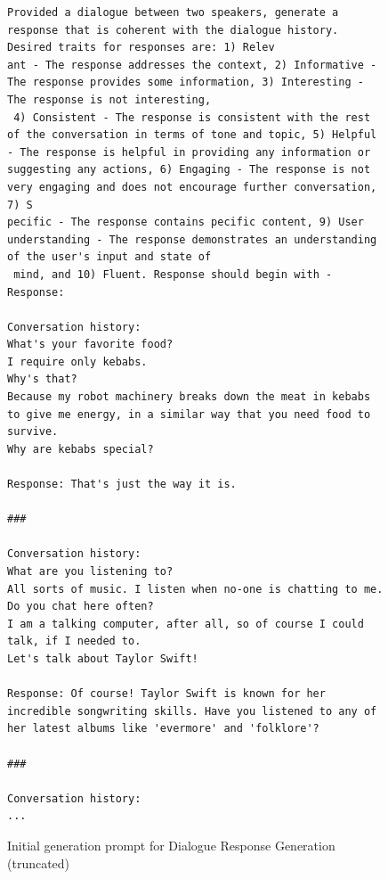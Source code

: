 \begin{figure}

\begin{small}
    \captionsetup{justification=centering, labelfont=bf, font=small}
    \begin{verbatim}
Provided a dialogue between two speakers, generate a response that is coherent with the dialogue history. Desired traits for responses are: 1) Relev
ant - The response addresses the context, 2) Informative - The response provides some information, 3) Interesting - The response is not interesting,
 4) Consistent - The response is consistent with the rest of the conversation in terms of tone and topic, 5) Helpful - The response is helpful in providing any information or suggesting any actions, 6) Engaging - The response is not very engaging and does not encourage further conversation, 7) S
pecific - The response contains pecific content, 9) User understanding - The response demonstrates an understanding of the user's input and state of
 mind, and 10) Fluent. Response should begin with - Response:

Conversation history:
What's your favorite food?
I require only kebabs.
Why's that?
Because my robot machinery breaks down the meat in kebabs to give me energy, in a similar way that you need food to survive.
Why are kebabs special?

Response: That's just the way it is.

###

Conversation history:
What are you listening to?
All sorts of music. I listen when no-one is chatting to me.
Do you chat here often?
I am a talking computer, after all, so of course I could talk, if I needed to.
Let's talk about Taylor Swift!

Response: Of course! Taylor Swift is known for her incredible songwriting skills. Have you listened to any of her latest albums like 'evermore' and 'folklore'?

###

Conversation history:
...
\end{verbatim}
\end{small}
\caption{Initial generation prompt for Dialogue Response Generation (truncated) }
    \label{fig:prompt:response:init}
\end{figure}


